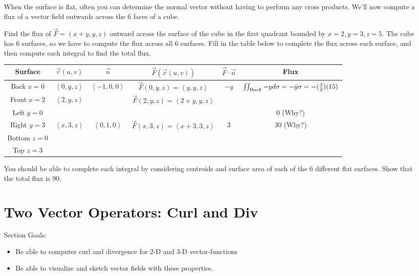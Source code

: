 When the surface is flat, often you can determine the normal vector without having to perform any cross products.  We'll now compute a flux of a vector field outwards across the 6 faces of a cube. 

\begin{problem}\label{boxflux} 

Find the flux of $ \vec F=(x+y,y,z) $ outward across the surface of the cube in the first quadrant bounded by {$ x=2,y=3,z=5 $}. The cube has 6 surfaces, so we have to compute the flux across all 6 surfaces. Fill in the table below to complete the flux across each surface, and then compute each integral to find the total flux. 
\begin{center}
\begin{tabular}{|c|c|c|c|c|c|}
\hline
Surface&$\vec r(u,v)$ & $\vec n$ & $\vec F(\vec r(u,v))$ & $\vec F\cdot \vec n$  & Flux\\\hline
Back $x=0$&$ \left<0,y,z\right>$   & $ \left<-1,0,0\right>$ & $\vec F(0,y,z) = \left<y,y,z\right>$ & $-y$&  $\iint_{\text Back} -y d\sigma = -\bar y \sigma=-(\frac{3}{2})(15)$\\\hline
Front $x=2$& $ \left<2,y,z\right>$ &  & $\vec F(2,y,z) = \left<2+y,y,z\right>$ &  & \\\hline
Left $y=0$&     & &  & &  $0$ (Why?)\\\hline
Right $y=3$&   $ \left<x,3,z\right>$      & $ \left<0,1,0\right>$  & $\vec F(x,3,z) = \left<x+3,3,z\right>$ & 3 & 30 (Why?) \\\hline
Bottom $z=0$&     & &  & & \\\hline
Top $z=3$&    & &  & & \\\hline
\end{tabular} 
\end{center}
You should be able to complete each integral by considering centroids and surface area of each of the 6 different flat surfaces. Show that the total flux is 90. 
\end{problem}

\newpage
\uday
\normalsize

\section{Two Vector Operators: Curl and Div}
Section Goals:
\begin{itemize}
\item Be able to computer curl and divergence for 2-D and 3-D vector-functions
\item Be able to visualize and sketch vector fields with these properties.
\end{itemize}

